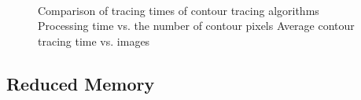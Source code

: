 \begin{figure}[htbp]
	\centering
	\\

	\caption{Comparison of tracing times of contour tracing algorithms \protect{} Processing time vs. the number of contour pixels      \protect{} Average contour tracing time vs. images}
	\label{fig:image18}
\end{figure}



\subsection{Reduced Memory}


